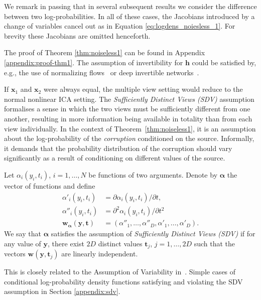 We remark in passing that in several subsequent results we consider the difference between two log-probabilities.
In all of these cases, the Jacobians introduced by a change of variables cancel out as in Equation \ref{eq:logdens_noiesless_1}.
For brevity these Jacobians are omitted henceforth.

The proof of Theorem \ref{thm:noiseless1} can be found in Appendix \ref{appendix:proof-thm1}.
The assumption of invertibility for $\bm{h}$ could be satisfied by, e.g., the use of normalizing flows~\cite{rezende2015variational, chen2018neural} or deep invertible networks~\cite{jacobsen_hal-01712808}.


If $\bm{x}_1$ and $\bm{x}_2$ were always equal, the multiple view setting would reduce to the normal nonlinear ICA setting.
The \emph{Sufficiently Distinct Views (SDV)} assumption formalises a sense in which the two views must be sufficiently different from one another,
resulting in more information being available in totality than from each view individually.
In the context of Theorem~\ref{thm:noiseless1}, it is an assumption about the log-probability of the \emph{corruption} conditioned on the source.
Informally, it demands that the probability distribution of the corruption should vary significantly as a result of conditioning on different values of the source.

\medskip

\begin{definition}\label{suff_dist_assumption}
	Let $\alpha_i(y_i, t_i)$, $i=1,\ldots, N$ be functions of two arguments.
	Denote by $\bm\alpha$ the vector of functions and define
	\begin{align}
	\alpha'_{i}(y_i, t_i)&= \partial \alpha_{i}(y_i, t_i)/\partial t, \label{eq:convention1}\\
	\alpha''_{i}(y_i, t_i)&=\partial^2 \alpha_{i}(y_i, t_i)/\partial t^2\, \label{eq:convention2}\\
	\bm{w}_{\bm\alpha}(\bm{y}, \bm{t}) &= (\alpha''_{1}, \ldots, \alpha''_{D}, \alpha'_{1}, \ldots,\alpha'_{D}).
	\end{align}
	We say that $\bm{\alpha}$ satisfies the assumption of \emph{Sufficiently Distinct Views (SDV)} if for any value of $\bm{y}$, there exist $2D$ distinct values $\bm{t}_j$, $j=1, \ldots, 2D$ such that the vectors $\bm{w}(\bm{y},\bm{t}_j)$ are linearly independent.
	\\    \end{definition}
This is closely related to the Assumption of Variability in~\cite{hyvarinen19a}.
Simple cases of conditional log-probability density functions satisfying and violating the SDV assumption in Section \ref{appendix:sdv}.

